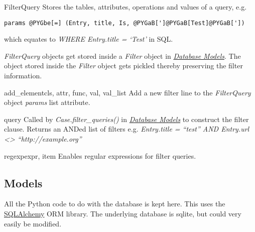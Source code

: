 \documentclass[letterpaper,10pt,english]{manual}
\begin{document}
\hypertarget{webscavator.model.filters.FilterQuery}{}\begin{classdesc}{FilterQuery}{}
Stores the tables, attributes, operations and values of a query, e.g.

\begin{Verbatim}[commandchars=@\[\]]
params @PYGbe[=] (Entry, title, Is, @PYGaB[']@PYGaB[Test]@PYGaB['])
\end{Verbatim}

which equates to \emph{WHERE Entry.title = `Test'} in SQL.

\emph{FilterQuery} objects get stored inside a \emph{Filter} object in \hyperlink{--doc-models}{\emph{Database Models}}. The
object stored inside the \emph{Filter} object gets pickled thereby preserving the
filter information.

\hypertarget{webscavator.model.filters.FilterQuery.add_element}{}\begin{methoddesc}{add\_element}{cls, attr, func, val, val\_list}
Add a new filter line to the \emph{FilterQuery} object \emph{params} list 
attribute.
\end{methoddesc}

\hypertarget{webscavator.model.filters.FilterQuery.query}{}\begin{methoddesc}{query}{}
Called by \emph{Case.filter\_queries()} in \hyperlink{--doc-models}{\emph{Database Models}} to construct the filter
clause. Returns an ANDed list of filters e.g. \emph{Entry.title = ``test'' AND
Entry.url \textless{}\textgreater{} ``http://example.org''}
\end{methoddesc}
\end{classdesc}

\hypertarget{webscavator.model.filters.regexp}{}\begin{funcdesc}{regexp}{expr, item}
Enables regular expressions for filter queries.
\end{funcdesc}
\hypertarget{module-webscavator.model}{}
\modulesynopsis{}

\subsection{Models}

All the Python code to do with the database is kept here. This uses the 
\href{http://www.sqlalchemy.org/}{SQLAlchemy} ORM library. The underlying database
is sqlite, but could very easily be modified.
\end{document}

